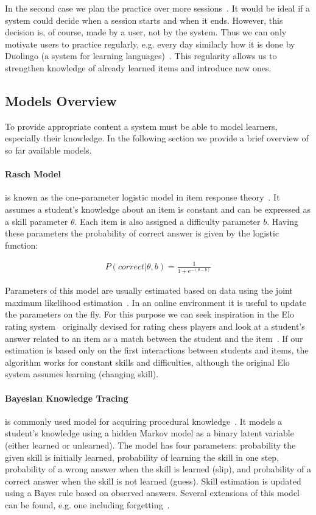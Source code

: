 \documentclass[table,color,cover,twoside,nolot,nolof]{fithesis3/fithesis3}
\begin{document}
In the second case we plan the practice over more
sessions~\cite{kang2014retrieval}. It would be ideal if a system could decide when a
session starts and when it ends. However, this decision is, of course, made by a user,
not by the system. Thus we can only motivate users to practice regularly, e.g.
every day similarly how it is done by Duolingo (a system for learning
languages)~\cite{garcia2013learning}. This regularity allows us to strengthen
knowledge of already learned items and introduce new ones.

\subsection{Models Overview}

To provide appropriate content a system must be able to model learners,
especially their knowledge. In the following section we provide a brief
overview of so far available models.

\paragraph*{Rasch Model} is known as the one-parameter logistic model in item
response theory~\cite{de2008theory}. It assumes a student's knowledge about
an item is constant and can be expressed as a skill parameter $\theta$. Each
item is also assigned a difficulty parameter $b$. Having these parameters
the probability of correct answer is given by the logistic function:

\begin{align}
P(correct|\theta,b) = \frac{1}{1 + e^{-(\theta - b)}}
\end{align}

Parameters of this model are usually estimated based on data using the joint
maximum likelihood estimation~\cite{de2008theory}. In an online environment it is
useful to update the parameters on the fly. For this purpose we can seek
inspiration in the Elo rating system~\cite{elo1978rating} originally devised for
rating chess players and look at a student's answer related to an item as a
match between the student and the item~\cite{papousek2014adaptive}. If our
estimation is based only on the first interactions between students and items,
the algorithm works for constant skills and difficulties, although the original
Elo system assumes learning (changing skill).

\paragraph*{Bayesian Knowledge Tracing} is commonly used model for
acquiring procedural knowledge~\cite{van2013properties}. It models a student's
knowledge using a hidden Markov model as a binary latent variable (either learned
or unlearned). The model has four parameters: probability the given skill is
initially learned, probability of learning the skill in one step, probability of
a wrong answer when the skill is learned (slip), and probability of a correct
answer when the skill is not learned (guess). Skill estimation is updated using
a Bayes rule based on observed answers. Several extensions of this model can be
found, e.g. one including forgetting~\cite{qiu2011does}.
\end{document}
